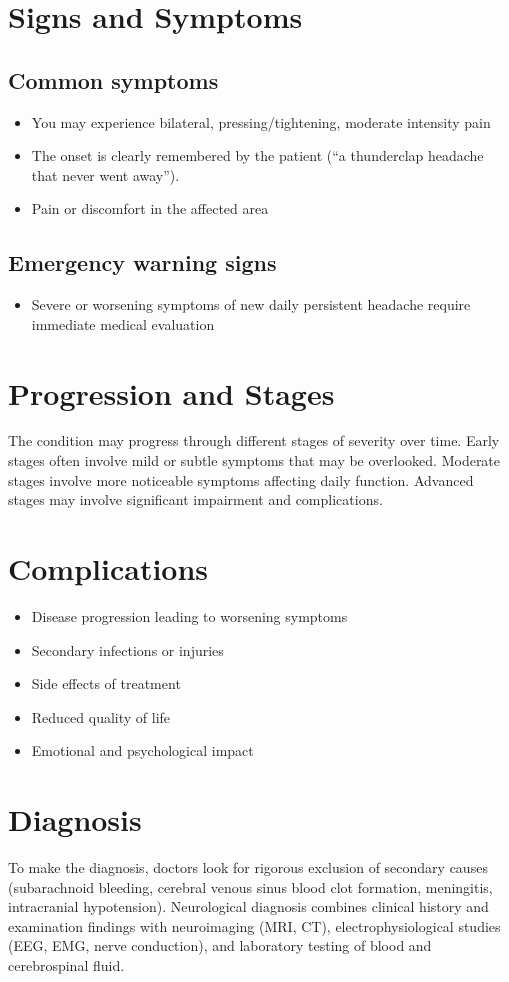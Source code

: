 \section{Signs and Symptoms}
\subsection{Common symptoms}
\begin{itemize}[noitemsep]
  \item You may experience bilateral, pressing/tightening, moderate intensity pain
  \item The onset is clearly remembered by the patient (``a thunderclap headache that never went away'').
  \item Pain or discomfort in the affected area
  \end{itemize}
\subsection{Emergency warning signs}
\begin{itemize}[noitemsep]
  \item Severe or worsening symptoms of new daily persistent headache require immediate medical evaluation
\end{itemize}
\section{Progression and Stages}
The condition may progress through different stages of severity over time. Early stages often involve mild or subtle symptoms that may be overlooked. Moderate stages involve more noticeable symptoms affecting daily function. Advanced stages may involve significant impairment and complications.
\section{Complications}
\begin{itemize}[noitemsep]
  \item Disease progression leading to worsening symptoms
  \item Secondary infections or injuries
  \item Side effects of treatment
  \item Reduced quality of life
  \item Emotional and psychological impact
\end{itemize}
\section{Diagnosis}
To make the diagnosis, doctors look for rigorous exclusion of secondary causes (subarachnoid bleeding, cerebral venous sinus blood clot formation, meningitis, intracranial hypotension). Neurological diagnosis combines clinical history and examination findings with neuroimaging (MRI, CT), electrophysiological studies (EEG, EMG, nerve conduction), and laboratory testing of blood and cerebrospinal fluid.

